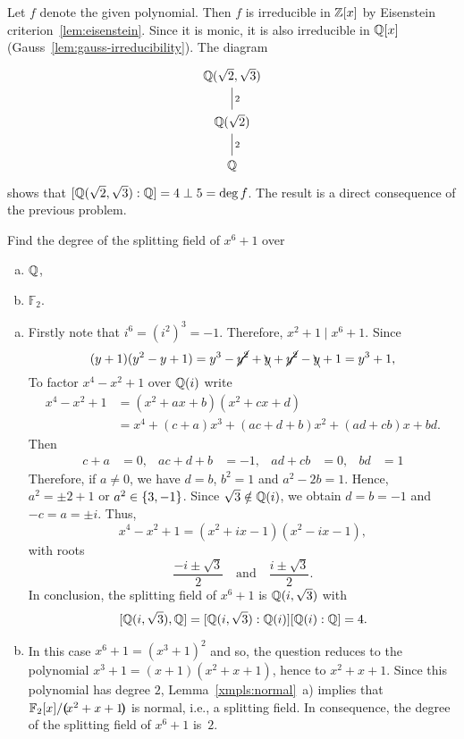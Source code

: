 \begin{solution}
    Let $f$ denote the given polynomial. Then $f$ is irreducible in $\mathbb{Z}[x]$ by Eisenstein criterion~\ref{lem:eisenstein}. Since it is monic, it is also irreducible in $\mathbb{Q}[x]$ (Gauss~\ref{lem:gauss-irreducibility}). The diagram
    $$
        \begin{tikzcd}[column sep=tiny]
            \Q(\sqrt2,\sqrt3)\\
            \Q(\sqrt2)
                    \arrow[u,no head,"2"']\\
            \Q
                    \arrow[u,no head,"2"']
        \end{tikzcd}
    $$
    shows that $[\mathbb{Q}(\sqrt2,\sqrt3):\mathbb{Q}]=4\perp5=\deg f$. The result is a direct consequence of the previous problem.
\end{solution}

\begin{probl}
    Find the degree of the splitting field of\/ $x^6 + 1$ over
    \begin{enumerate}[a), font=\upshape]
        \item $\mathbb{Q}$,
        \item $\mathbb{F}_2$.
    \end{enumerate}
\end{probl}

\begin{solution}
    \begin{enumerate}[a), font=\upshape]
        \item Firstly note that $i^6=(i^2)^3=-1$. Therefore, $x^2+1\mid x^6+1$. Since
        $$
            (y+1)(y^2-y+1)=y^3-\cancel{y^2}+\bcancel y+\cancel{y^2}-\bcancel y+1=y^3+1,
        $$
        To factor $x^4-x^2+1$ over $\mathbb{Q}(i)$ write
        \begin{align*}
            x^4-x^2+1 &= (x^2+ax+b)(x^2+cx+d)\\
                &= x^4 + (c+a)x^3 + (ac+d+b)x^2+(ad+cb)x+bd.
        \end{align*}
        Then
        \begin{align*}
            c+a &= 0,   &ac+d+b&=-1, &ad+cb&=0,  &bd&=1
        \end{align*}
        Therefore, if $a\ne0$, we have $d=b$, $b^2=1$ and $a^2-2b=1$. Hence, $a^2=\pm2 +1$ or $a^2\in\{3,-1\}$. Since $\sqrt3\notin\mathbb{Q}(i)$, we obtain $d=b=-1$ and $-c=a=\pm i$. Thus,
        $$
            x^4-x^2+1 = (x^2+ix-1)(x^2-ix-1),
        $$
        with roots
        $$
            \frac{-i\pm\sqrt3}2\quad\text{and}\quad\frac{i\pm\sqrt3}2.
        $$
        In conclusion, the splitting field of $x^6+1$ is $\mathbb{Q}(i,\sqrt3)$ with 
        $$
            [\mathbb{Q}(i,\sqrt3),\mathbb{Q}]=[\mathbb{Q}(i,\sqrt3):\mathbb{Q}(i)][\mathbb{Q}(i):\mathbb{Q}]=4.
        $$

        \item In this case $x^6+1=(x^3+1)^2$ and so, the question reduces to the polynomial $x^3+1=(x+1)(x^2+x+1)$, hence to $x^2+x+1$. Since this polynomial has degree $2$, Lemma~\ref{xmpls:normal}~a) implies that $\mathbb F_2[x]/\textrm{\boldmath$($}\!x^2+x+1\!\textrm{\boldmath$)$}$ is normal, i.e., a splitting field. In consequence, the degree of the splitting field of $x^6+1$ is~$2$. 
    \end{enumerate}
\end{solution}

